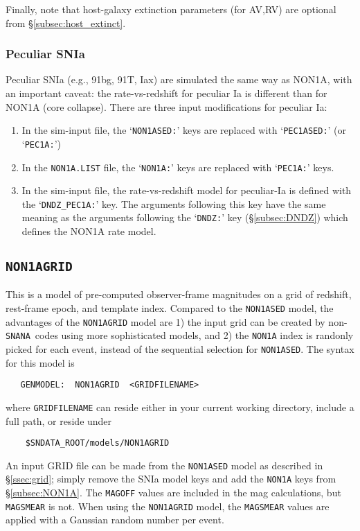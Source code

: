 \documentclass[12pt]{article}
\newcommand{\snana}{{\tt SNANA}}
\begin{document}
Finally, note that host-galaxy extinction parameters (for AV,RV) 
are optional from \S\ref{subsec:host_extinct}.

\subsubsection{Peculiar SNIa}
\label{sss:pec1a}

Peculiar SNIa (e.g., 91bg, 91T, Iax) are simulated the
same way as NON1A, with an important caveat:
the rate-vs-redshift for peculiar Ia is different than
for NON1A (core collapse).
There are three input modifications for peculiar Ia:
%
\begin{enumerate}
   \item In the sim-input file, the `{\tt NON1ASED:}' keys are replaced
         with `{\tt PEC1ASED:}' (or `{\tt PEC1A:}') 
   \item In the {\tt NON1A.LIST} file, the `{\tt NON1A:}' keys are 
          replaced with `{\tt PEC1A:}'  keys.
   \item In the sim-input file, the rate-vs-redshift model 
         for peculiar-Ia is defined with the `{\tt DNDZ\_PEC1A:}' key. 
         The arguments
         following this key have the same meaning as the
         arguments following the `{\tt DNDZ:}' key 
         (\S\ref{subsec:DNDZ}) which defines the NON1A rate model.
\end{enumerate}


\subsection{\tt NON1AGRID}
\label{subsec:NON1AGRID}

This is a model of pre-computed observer-frame magnitudes on 
a grid of redshift, rest-frame epoch, and template index.
Compared to the {\tt NON1ASED} model, the advantages of
the {\tt NON1AGRID} model are 1) the input grid can be
created by non-\snana\ codes using more sophisticated models,
and 2) the {\tt NON1A} index is randonly picked for each event,
instead of the sequential selection for {\tt NON1ASED}.
The syntax for this model is
\begin{verbatim}
   GENMODEL:  NON1AGRID  <GRIDFILENAME>
\end{verbatim}
%
where {\tt GRIDFILENAME} can reside either in your current
working directory, include a full path, or reside under
\begin{verbatim}
    $SNDATA_ROOT/models/NON1AGRID
\end{verbatim}
%
An input GRID file can be made from the {\tt NON1ASED} model
as described in \S\ref{ssec:grid}; simply remove the SNIa model
keys and add the {\tt NON1A} keys from \S\ref{subsec:NON1A}.
The {\tt MAGOFF} values are included in the mag calculations,
but {\tt MAGSMEAR} is not. When using the {\tt NON1AGRID} model,
the {\tt MAGSMEAR} values are applied with a Gaussian random
number per event.
\end{document}
